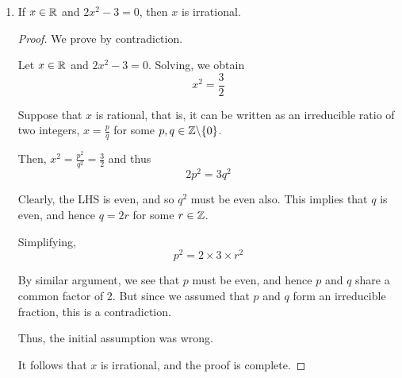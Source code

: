 \begin{enumerate}
\begin{proof}
        Hence, if the result is true for $n=k$ for some $k \in \Z^+$,
        then it is also true for $n=k+1$.

        Therefore, the result is proved for all positive integers $n$,
        by induction, and the proof is complete.
    \end{proof}

\item
    \begin{theorem}
        If $x \in \mathbb{R}$ and $2x^2 - 3 = 0$, then $x$ is irrational.
    \end{theorem}
    \begin{proof}
        We prove by contradiction.

        Let $x \in \mathbb{R}$ and $2x^2 - 3 = 0$.
        Solving, we obtain
        $$x^2 = \frac{3}{2}$$

        Suppose that $x$ is rational, that is, it can be written as an
        irreducible ratio of two integers, $x = \frac{p}{q}$ for some
        $p, q \in \mathbb{Z} \backslash \{0\}$.

        Then, $x^2 = \frac{p^2}{q^2} = \frac{3}{2}$ and thus
        $$2p^2 = 3q^2$$

        Clearly, the LHS is even, and so $q^2$ must be even also.
        This implies that $q$ is even, and hence $q = 2r$ for some
        $r \in \mathbb{Z}$.

        Simplifying,
        $$p^2 = 2 \times 3 \times r^2$$

        By similar argument, we see that $p$ must be even, and hence
        $p$ and $q$ share a common factor of 2.
        But since we assumed that $p$ and $q$ form an irreducible
        fraction, this is a contradiction.

        Thus, the initial assumption was wrong.

        It follows that $x$ is irrational, and the proof is complete.
    \end{proof}
\end{enumerate}
